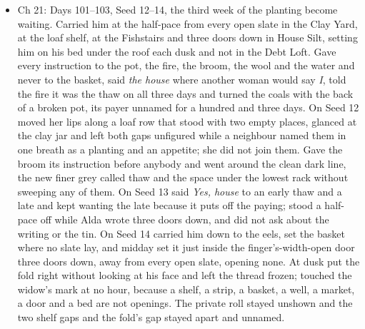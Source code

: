 \documentclass{design/chronicle}
\begin{document}
{\begin{itemize}[leftmargin=1.4em,itemsep=1pt,topsep=3pt,parsep=0pt]
\item Ch 21: Days 101–103, Seed 12–14, the third week of the planting become waiting. Carried him at the half-pace from every open slate in the Clay Yard, at the loaf shelf, at the Fishstairs and three doors down in House Silt, setting him on his bed under the roof each dusk and not in the Debt Loft. Gave every instruction to the pot, the fire, the broom, the wool and the water and never to the basket, said \emph{the house} where another woman would say \emph{I}, told the fire it was the thaw on all three days and turned the coals with the back of a broken pot, its payer unnamed for a hundred and three days. On Seed 12 moved her lips along a loaf row that stood with two empty places, glanced at the clay jar and left both gaps unfigured while a neighbour named them in one breath as a planting and an appetite; she did not join them. Gave the broom its instruction before anybody and went around the clean dark line, the new finer grey called thaw and the space under the lowest rack without sweeping any of them. On Seed 13 said \emph{Yes, house} to an early thaw and a late and kept wanting the late because it puts off the paying; stood a half-pace off while Alda wrote three doors down, and did not ask about the writing or the tin. On Seed 14 carried him down to the eels, set the basket where no slate lay, and midday set it just inside the finger’s-width-open door three doors down, away from every open slate, opening none. At dusk put the fold right without looking at his face and left the thread frozen; touched the widow’s mark at no hour, because a shelf, a strip, a basket, a well, a market, a door and a bed are not openings. The private roll stayed unshown and the two shelf gaps and the fold’s gap stayed apart and unnamed.

\end{itemize}

\begin{itemize}[leftmargin=1.4em,itemsep=1pt,topsep=3pt,parsep=0pt]


\end{itemize}}
\end{document}
